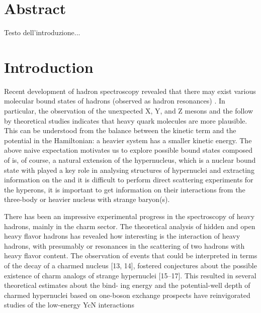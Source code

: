 \documentclass[12pt,a4paper]{book}
\begin{document}
	\tableofcontents  %
	
	\newpage
	
	\chapter{Abstract}
	Testo dell'introduzione...
	
	\newpage
	\chapter{Introduction}
	
	Recent development of hadron spectroscopy revealed that there may exist various molecular bound states of hadrons (observed as hadron resonances) . In particular, the observation	of the unexpected X, Y, and Z mesons and the follow by theoretical studies indicates that heavy quark molecules are more plausible. This can be understood from the balance between the kinetic term and the potential in the Hamiltonian: a heavier system has a smaller kinetic
	energy. The above naive expectation motivates us to explore possible bound states composed of
	is, of course, a natural extension of the hypernucleus, which is a nuclear bound state with
	played a key role in analysing structures of hypernuclei and extracting information on the
	and it is difficult to perform direct scattering experiments for the hyperons, it is important
	to get information on their interactions from the three-body or heavier nucleus with strange
	baryon(s).
	
	There has been an impressive experimental progress in the spectroscopy of heavy hadrons,
	mainly in the charm sector. The theoretical analysis of hidden and open heavy flavor
	hadrons has revealed how interesting is the interaction of heavy hadrons, with presumably
	or resonances in the scattering of two hadrons with heavy flavor content.  The observation of events that could be interpreted in terms of the decay of a
	charmed nucleus [13, 14], fostered conjectures about the possible existence of charm analogs
	of strange hypernuclei [15–17]. This resulted in several theoretical estimates about the bind-
	ing energy and the potential-well depth of charmed hypernuclei based on one-boson exchange
	prospects have reinvigorated studies of the low-energy YcN interactions
	
\end{document}
